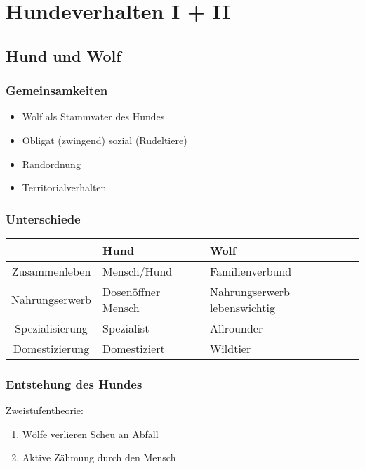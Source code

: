 \chapter{Hundeverhalten I + II}


\section{Hund und Wolf}

    \subsection{Gemeinsamkeiten}
    \begin{itemize}
        \item Wolf als Stammvater des Hundes
        \item Obligat (zwingend) sozial (Rudeltiere)
        \item Randordnung
        \item Territorialverhalten
    \end{itemize}

    \subsection{Unterschiede}
    \begin{center}
        \begin{tabular}{c|l|l}
            & \textbf{Hund} & \textbf{Wolf} \\
            \hline
            Zusammenleben   & Mensch/Hund & Familienverbund \\
            Nahrungserwerb  & Dosenöffner Mensch & Nahrungserwerb lebenswichtig \\
            Spezialisierung & Spezialist & Allrounder \\
            Domestizierung  & Domestiziert & Wildtier
        \end{tabular}
    \end{center}

    \subsection{Entstehung des Hundes}
    Zweistufentheorie:
    \begin{enumerate}
        \item Wölfe verlieren Scheu an Abfall
        \item Aktive Zähmung durch den Mensch
    \end{enumerate}


